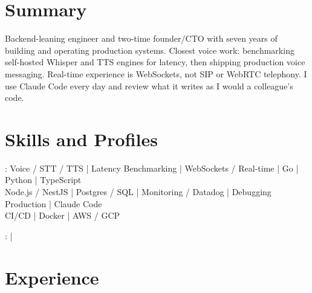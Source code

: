 \documentclass[print]{jack-resume}
\begin{document}
\pagecolor{darkmodeBackground}


\begin{minipage}[t][1cm][t]{.03\textwidth}
    \hfill
\end{minipage}

\section{Summary}
Backend-leaning engineer and two-time founder/CTO with seven years of building and operating production systems. Closest voice work: benchmarking self-hosted Whisper and TTS engines for latency, then shipping production voice messaging. Real-time experience is WebSockets, not SIP or WebRTC telephony. I use Claude Code every day and review what it writes as I would a colleague's code.
\sectionsep

\section{Skills and Profiles}
:
Voice / STT / TTS \hfill | \hfill
Latency Benchmarking \hfill | \hfill
WebSockets / Real-time \hfill | \hfill
Go \hfill | \hfill
Python \hfill | \hfill
TypeScript \\
\hspace{1.0cm} Node.js / NestJS \hfill | \hfill
Postgres / SQL \hfill | \hfill
Monitoring / Datadog \hfill | \hfill
Debugging Production \hfill | \hfill
Claude Code \\
\hspace{1.0cm} CI/CD \hfill | \hfill
Docker \hfill | \hfill
AWS / GCP \\

\raggedright{
    :
      \href{https://www.linkedin.com/in/jack-sturtevant/}{ \ExternalLink} |
     \href{https://github.com/jacksturt}{ \ExternalLink}}

\section{Experience}
\end{document}
